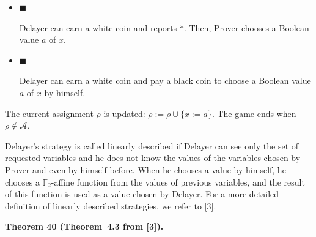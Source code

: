 \begin{itemize}


\item 
$\blacksquare$ 


Delayer can earn a white coin and reports $*$. Then, Prover chooses a Boolean value $a$ of $x$.\par





\item 
$\blacksquare$ 


Delayer can earn a white coin and pay a black coin to choose a Boolean value $a$ of $x$ by himself.\par





\end{itemize}


The current assignment $\rho$ is updated: $\rho:=\rho\cup\{x:=a\}$. The game ends when $\rho\notin\mathcal{A}$.\par



Delayer’s strategy is called linearly described if Delayer can see only the set of requested variables and he does not know the values of the variables chosen by Prover and even by himself before. When he chooses a value by himself, he chooses a $\mathbb{F}_{2}$-affine function from the values of previous variables, and the result of this function is used as a value chosen by Delayer. For a more detailed definition of linearly described strategies, we refer to [3].\par



\par\medskip\noindent\textbf{
Theorem 40 (Theorem 4.3 from [3]).
}\par



